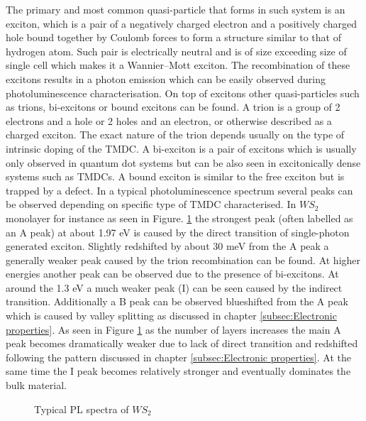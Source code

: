 \documentclass[12pt]{article}
\begin{document}
	The primary and most common quasi-particle that forms in such system is an exciton, which is a pair of a negatively charged electron and a positively charged hole bound together by Coulomb forces to form a structure similar to that of hydrogen atom. Such pair is electrically neutral and is of size exceeding size of single cell which makes it a Wannier–Mott exciton. The recombination of these excitons results in a photon emission which can be easily observed during photoluminescence characterisation. On top of excitons other quasi-particles such as trions, bi-excitons or bound excitons can be found. A trion is a group of 2 electrons and a hole or 2 holes and an electron, or otherwise described as a charged exciton. The exact nature of the trion depends usually on the type of intrinsic doping of the TMDC. A bi-exciton is a pair of excitons which is usually only observed in quantum dot systems but can be also seen in excitonically dense systems such as TMDCs. A bound exciton is similar to the free exciton but is trapped by a defect. In a typical photoluminescence spectrum several peaks can be observed depending on specific type of TMDC characterised. In $WS_2$ monolayer for instance as seen in Figure. \ref{fig:WS2TypicalPLSpectra} the strongest peak (often labelled as an A peak) at about 1.97 eV is caused by the direct transition of single-photon generated exciton. Slightly redshifted by about 30 meV from the A peak a generally weaker peak caused by the trion recombination can be found. At higher energies another peak can be observed due to the presence of bi-excitons. At around the 1.3 eV a much weaker peak (I) can be seen caused by the indirect transition. Additionally a B peak can be observed blueshifted from the A peak which is caused by valley splitting as discussed in chapter \ref{subsec:Electronic properties}. As seen in Figure \ref{fig:WS2TypicalPLSpectra} as the number of layers increases the main A peak becomes dramatically weaker due to lack of direct transition and redshifted following the pattern discussed in chapter \ref{subsec:Electronic properties}. At the same time the I peak becomes relatively stronger and eventually dominates the bulk material.
		
	\begin{figure}[h]
	\begin{center}
	\caption{Typical PL spectra of $WS_2$}
	\label{fig:WS2TypicalPLSpectra}
	\end{center}
	\end{figure}
		
\end{document}
